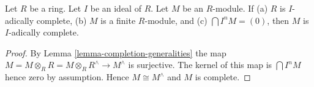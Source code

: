 \begin{lemma}
\label{lemma-when-finite-module-complete-over-complete-ring}
Let $R$ be a ring. Let $I$ be an ideal of $R$.
Let $M$ be an $R$-module.
If (a) $R$ is $I$-adically complete, (b) $M$ is a finite $R$-module,
and (c) $\bigcap I^nM = (0)$, then $M$ is $I$-adically complete.
\end{lemma}

\begin{proof}
By Lemma \ref{lemma-completion-generalities}
the map $M = M \otimes_R R = M \otimes_R R^\wedge \to M^\wedge$
is surjective. The kernel of this map is $\bigcap I^nM$ hence zero
by assumption. Hence $M \cong M^\wedge$ and $M$ is complete.
\end{proof}
